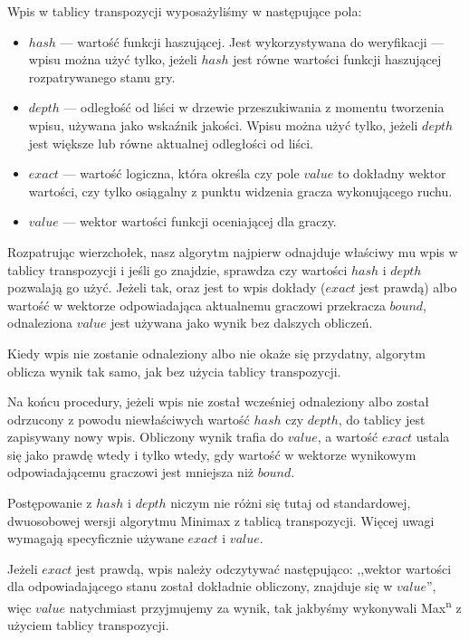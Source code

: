 \documentclass{pracamgr}
\begin{document}
Wpis w tablicy transpozycji wyposażyliśmy w następujące pola:

\begin{itemize}
\item{\(hash\) --- wartość funkcji haszującej. Jest wykorzystywana do weryfikacji --- wpisu można użyć tylko, jeżeli \(hash\) jest równe wartości funkcji haszującej rozpatrywanego stanu gry.}
\item{\(depth\) --- odległość od liści w drzewie przeszukiwania z momentu tworzenia wpisu, używana jako wskaźnik jakości. Wpisu można użyć tylko, jeżeli \(depth\) jest większe lub równe aktualnej odległości od liści.}
\item{\(exact\) --- wartość logiczna, która określa czy pole \(value\) to dokładny wektor wartości, czy tylko osiągalny z punktu widzenia gracza wykonującego ruchu.}
\item{\(value\) --- wektor wartości funkcji oceniającej dla graczy.}
\end{itemize}

Rozpatrując wierzchołek, nasz algorytm najpierw odnajduje właściwy mu wpis w tablicy transpozycji i jeśli go znajdzie, sprawdza czy wartości \(hash\) i \(depth\) pozwalają go użyć.
Jeżeli tak, oraz jest to wpis dokłady (\(exact\) jest prawdą) albo wartość w wektorze odpowiadająca aktualnemu graczowi przekracza \(bound\), odnaleziona \(value\) jest używana jako wynik bez dalszych obliczeń.

Kiedy wpis nie zostanie odnaleziony albo nie okaże się przydatny, algorytm oblicza wynik tak samo, jak bez użycia tablicy transpozycji.

Na końcu procedury, jeżeli wpis nie został wcześniej odnaleziony albo został odrzucony z powodu niewłaściwych wartość \(hash\) czy \(depth\), do tablicy jest zapisywany nowy wpis.
Obliczony wynik trafia do \(value\), a wartość \(exact\) ustala się jako prawdę wtedy i tylko wtedy, gdy wartość w wektorze wynikowym odpowiadającemu graczowi jest mniejsza niż \(bound\).

Postępowanie z \(hash\) i \(depth\) niczym nie różni się tutaj od standardowej, dwuosobowej wersji algorytmu Minimax z tablicą transpozycji.
Więcej uwagi wymagają specyficznie używane \(exact\) i \(value\).

Jeżeli \(exact\) jest prawdą, wpis należy odczytywać następująco: ,,wektor wartości dla odpowiadającego stanu został dokładnie obliczony, znajduje się w \(value\)'', więc \(value\) natychmiast przyjmujemy za wynik, tak jakbyśmy wykonywali Max\textsuperscript{n} z użyciem tablicy transpozycji.
\end{document}

